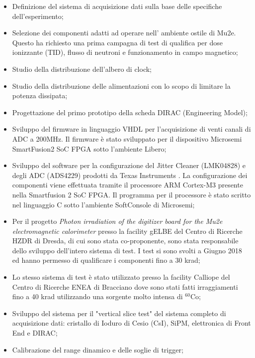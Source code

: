 \documentclass[10pt]{article}
\begin{document}
\begin{itemize}
\item Definizione del sistema di acquisizione dati sulla base delle specifiche dell'esperimento;
\item Selezione dei componenti adatti ad operare nell' ambiente ostile di Mu2e. Questo ha richiesto una prima campagna di test di qualifica per dose ionizzante (TID), flusso di neutroni e funzionamento in campo magnetico;
\item Studio della distribuzione dell'albero di clock;
\item Studio della distribuzione delle alimentazioni con lo scopo di limitare la potenza dissipata;
\item Progettazione del primo prototipo della scheda DIRAC (Engineering Model);
\item Sviluppo del firmware in linguaggio VHDL per l'acquisizione di venti canali di ADC a 200MHz. Il firmware \`e stato sviluppato per il dispositivo Microsemi\textsuperscript{\textregistered}  SmartFusion2 SoC FPGA sotto l'ambiente Libero\textsuperscript{\textregistered};
\item Sviluppo del software  per la configurazione del Jitter Cleaner (LMK04828) e degli ADC (ADS4229) prodotti da Texas Instruments \textsuperscript{\textregistered}. La configurazione dei componenti viene effettuata tramite il processore ARM Cortex-M3 presente nella Smartfusion 2 SoC FPGA.  Il programma per il processore \`e stato scritto nel linguaggio C sotto l'ambiente SoftConsole di Microsemi\textsuperscript{\textregistered};
\item Per il progetto \emph{Photon irradiation of the digitizer board for the Mu2e electromagnetic calorimeter} presso la facility gELBE del Centro di Ricerche HZDR di Dresda, di cui sono stata co-proponente, sono stata responsabile dello sviluppo
dell'intero sistema di test. I test si sono svolti a Giugno 2018 ed hanno permesso di qualificare  i componenti fino a 30 krad; 
\item Lo stesso sistema di test \`e stato utilizzato presso la facility Calliope del Centro di Ricerche ENEA di Bracciano dove sono stati fatti irraggiamenti fino a 40 krad utilizzando una sorgente molto intensa di $^{60}$Co;
\item Sviluppo del sistema per il  "vertical slice test" del sistema completo di acquisizione dati: cristallo di Ioduro di Cesio (CsI), SiPM, elettronica di Front End e DIRAC;
\item Calibrazione del range dinamico e delle soglie di trigger;
\end{itemize}
\end{document}

